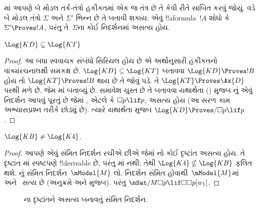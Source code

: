 \documentclass[../../../include/open-logic-section]{subfiles}
\begin{document}


માં આપણે બે મોડલ તર્ક-તંત્રો હકીકતમાં એક જ તંત્ર છે તે
કેવી રીતે સાબિત કરવું જોયું.  વડે બે મોડલ
તંત્રો $\Sigma$ અને $\Sigma'$ ભિન્ન છે તે બતાવી શકાય: એવું
!!a{formula}~$!A$ શોધો કે $\Sigma' \Proves !A$, પરંતુ તે~$\Sigma$ના
કોઈ નિદર્શનમાં અસત્ય હોય.

\begin{prop}
  $\Log{KD} \subsetneq \Log{KT}$
\end{prop}

\begin{proof} આ બધા સ્વવાચક સંબંધો સિરિયલ હોય છે એ અર્થાનુસારી હકીકતનો
  વાક્યરચનાલક્ષી સમકક્ષ છે. $\Log{KD} \subseteq
  \Log{KT}$ બતાવવા $\Log{KD} \Proves !B$ હોય તો
  $\Log{KT} \Proves !B$ થાય છે તે જોવું પડે. તે $\Log{KT} \Proves
  \Ax{D}$ પરથી મળે છે, જેમ
  માં બતાવ્યું છે.
  સમાવેશ ચુસ્ત છે તે બતાવવા યથાર્થતા
  () મુજબ નું એવું નિદર્શન આપવું પૂરતું
  છે જેમાં , એટલે કે $\Box p \lif p$, અસત્ય હોય (આ સરળ કામ
  અભ્યાસપ્રશ્ન તરીકે છોડ્યું છે). ત્યારે યથાર્થતા મુજબ $\Log{KD}
  \Proves/ \Box p \lif p$.
\end{proof}

\begin{prop}
  $\Log{KB} \neq \Log{K4}$. 
\end{prop}

\begin{proof}
  આપણે એવું સંમિત નિદર્શન રચીએ છીએ જેમાં નો કોઈ દૃષ્ટાંત અસત્ય
  હોય. તે દૃષ્ટાંત માં સ્પષ્ટપણે !!{derivable} છે, પરંતુ
  માં નથી; તેથી $\Log{K4} \nsubseteq \Log{KB}$ ફલિત થશે.
  નું સંમિત નિદર્શન~$\mModel{M}$ લો. નિદર્શન સંમિત
  હોવાથી~$\mModel{M}$માં  અને~ સત્ય છે
  (અનુક્રમે  અને
   મુજબ). પરંતુ
  $\mSat/{M}{\Box p \lif \Box\Box p}[w_1]$.
\end{proof}

\begin{figure}[htpb]
  \centering
  \caption{ના દૃષ્ટાંતને અસત્ય બનાવતું સંમિત નિદર્શન.}
\end{figure}
 
\end{document}
